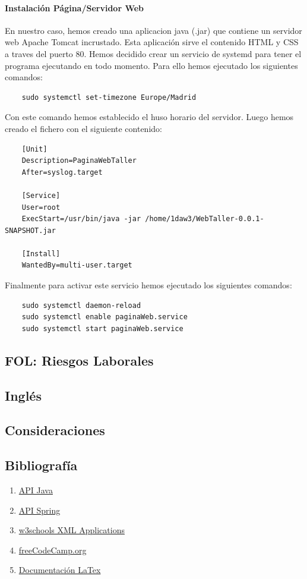 \documentclass{article}
\begin{document}
{  \paragraph{Instalación Página/Servidor Web}
  En nuestro caso, hemos creado una aplicacion java (.jar) que contiene un servidor web Apache Tomcat incrustado. Esta 
  aplicación sirve el contenido HTML y CSS a traves del puerto 80. Hemos decidido crear un servicio de systemd para tener 
  el programa ejecutando en todo momento. Para ello hemos ejecutado los siguientes comandos: 
  \begin{lstlisting}
    sudo systemctl set-timezone Europe/Madrid
  \end{lstlisting}
  Con este comando hemos establecido el huso horario del servidor.
  Luego hemos creado el fichero  con el siguiente contenido: 
  \begin{lstlisting}
    [Unit]
    Description=PaginaWebTaller
    After=syslog.target

    [Service]
    User=root
    ExecStart=/usr/bin/java -jar /home/1daw3/WebTaller-0.0.1-SNAPSHOT.jar

    [Install]
    WantedBy=multi-user.target  
  \end{lstlisting}
  Finalmente para activar este servicio hemos ejecutado los siguientes comandos:
  \begin{lstlisting}
    sudo systemctl daemon-reload
    sudo systemctl enable paginaWeb.service
    sudo systemctl start paginaWeb.service
  \end{lstlisting}
}
\subsection{FOL: Riesgos Laborales}

\subsection{Inglés}
\subsection{Consideraciones}
\subsection{Bibliografía}
\begin{enumerate}
  \item \href{https://docs.oracle.com/en/java/javase/18/docs/api/index.html}{API Java}
  \item \href{https://docs.spring.io/spring-framework/docs/current/javadoc-api/}{API Spring}
  \item \href{https://www.w3schools.com/xml/ajax_applications.asp}{w3schools XML Applications}
  \item \href{https://www.youtube.com/watch?v=vtPkZShrvXQ}{freeCodeCamp.org}
  \item \href{https://es.overleaf.com/learn}{Documentación LaTex}
\end{enumerate}
\end{document}
